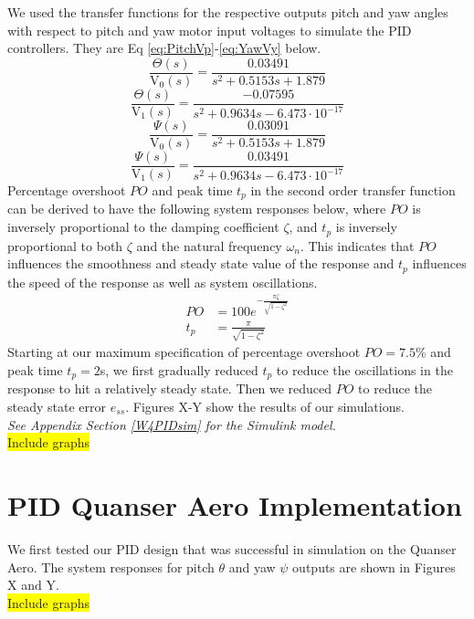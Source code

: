 \documentclass[11pt]{article}
\begin{document}
We used the transfer functions for the respective outputs pitch and yaw angles with respect to pitch and yaw motor input voltages to simulate the PID controllers. They are Eq \ref{eq:PitchVp}-\ref{eq:YawVy} below.
\begin{equation}\label{eq:PitchVp}
    \frac{\Theta (s)}{\text{V}_0 (s)} = \frac{0.03491}{s^2 + 0.5153 s + 1.879}
\end{equation}
\begin{equation}\label{eq:PitchVy}
    \frac{\Theta (s)}{\text{V}_1 (s)} = \frac{-0.07595}{s^2 + 0.9634 s - 6.473\cdot 10^{-17}}
\end{equation}
\begin{equation}\label{eq:YawVp}
    \frac{\Psi (s)}{\text{V}_0 (s)} = \frac{0.03091}{s^2 + 0.5153 s + 1.879}
\end{equation}
\begin{equation}\label{eq:YawVy}
    \frac{\Psi (s)}{\text{V}_1 (s)} = \frac{0.03491}{s^2 + 0.9634 s - 6.473\cdot 10^{-17}}
\end{equation}
Percentage overshoot $PO$ and peak time $t_p$ in the second order transfer function can be derived to have the following system responses below, where $PO$ is inversely proportional to the damping coefficient $\zeta$, and $t_p$ is inversely proportional to both $\zeta$ and the natural frequency $\omega_n$. This indicates that $PO$ influences the smoothness and steady state value of the response and $t_p$ influences the speed of the response as well as system oscillations.
\begin{align*}
    PO &= 100 e^{-\frac{\pi \zeta}{\sqrt{1 - \zeta^2}}}\\
    t_p &= \frac{\pi}{\sqrt{1 - \zeta^2}}
\end{align*}
Starting at our maximum specification of percentage overshoot $PO = 7.5$\% and peak time $t_p = 2$s, we first gradually reduced $t_p$ to reduce the oscillations in the response to hit a relatively steady state. Then we reduced $PO$ to reduce the steady state error $e_{ss}$. Figures X-Y show the results of our simulations.\\ \textit{See Appendix Section \ref{W4PIDsim} for the Simulink model.}\\
\colorbox{yellow}{Include graphs}

\newpage
\section{PID Quanser Aero Implementation}
We first tested our PID design that was successful in simulation on the Quanser Aero. The system responses for pitch $\theta$ and yaw $\psi$ outputs are shown in Figures X and Y.\\
\colorbox{yellow}{Include graphs}\\
\end{document}
